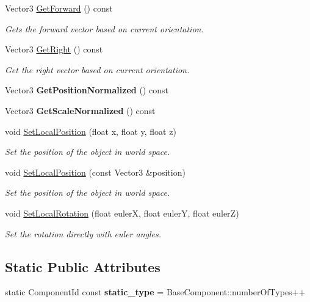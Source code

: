\begin{DoxyCompactItemize}
Vector3 \hyperlink{classTransformComponent_a71e0adb8dd3a35fdca3b50817bb807a4}{Get\+Forward} () const
\begin{DoxyCompactList}\small\item\em Gets the forward vector based on current orientation. \end{DoxyCompactList}\item 
Vector3 \hyperlink{classTransformComponent_a5fe2a35d3bcb6a07a231b0f463d6a64b}{Get\+Right} () const
\begin{DoxyCompactList}\small\item\em Get the right vector based on current orientation. \end{DoxyCompactList}\item 
\mbox{\label{classTransformComponent_a859926592b1550b27fc93ccb4da1e163}} 
Vector3 {\bfseries Get\+Position\+Normalized} () const
\item 
\mbox{\label{classTransformComponent_ae220c31211dd608d79d6eed78598562e}} 
Vector3 {\bfseries Get\+Scale\+Normalized} () const
\item 
void \hyperlink{classTransformComponent_a63fa0293901b73ed16151fb3ca0c81f3}{Set\+Local\+Position} (float x, float y, float z)
\begin{DoxyCompactList}\small\item\em Set the position of the object in world space. \end{DoxyCompactList}\item 
void \hyperlink{classTransformComponent_ac25ddafb688708cba6001e221fdd0b9d}{Set\+Local\+Position} (const Vector3 \&position)
\begin{DoxyCompactList}\small\item\em Set the position of the object in world space. \end{DoxyCompactList}\item 
void \hyperlink{classTransformComponent_aa1c412032c23c21644c84646e1e271ce}{Set\+Local\+Rotation} (float eulerX, float eulerY, float eulerZ)
\begin{DoxyCompactList}\small\item\em Set the rotation directly with euler angles. \end{DoxyCompactList}\end{DoxyCompactItemize}
\subsection*{Static Public Attributes}
\begin{DoxyCompactItemize}
\item 
\mbox{\label{classTransformComponent_a5d4711ad2a25a2d649a779d4d2842d14}} 
static Component\+Id const {\bfseries static\+\_\+type} = Base\+Component\+::number\+Of\+Types++
\end{DoxyCompactItemize}
